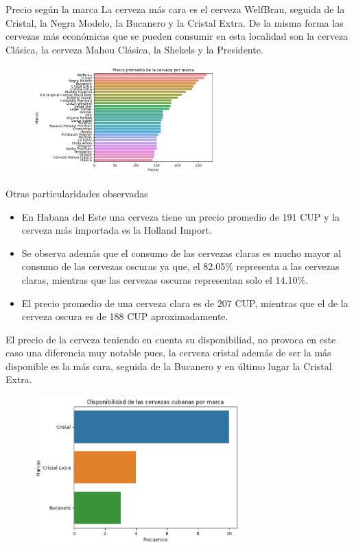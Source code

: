\documentclass{beamer}
\begin{document}
    \begin{frame}{Precio según la marca}
        \small La cerveza más cara es el cerveza WelfBrau, seguida de la Cristal, la Negra Modelo, la Bucanero y la Cristal Extra. De la misma forma las cervezas más económicas que se pueden consumir en esta localidad son la cerveza Clásica, la cerveza Mahou Clásica, la Shekels y la Presidente. 
        \begin{figure}[h]
        	\centering
        	\includegraphics[width=7cm]{price beer.png}
        \end{figure}

    \end{frame}
    \begin{frame}{Otras particularidades observadas}
        \begin{itemize}
    \item En Habana del Este una cerveza tiene un precio promedio de 191 CUP y la cerveza más importada es la Holland Import.
    \item  Se observa además que el consumo de las cervezas claras es mucho mayor al consumo de las cervezas oscuras ya que, el 82.05\% representa a las cervezas claras, mientras que las cervezas oscuras representan solo el 14.10\%.
    \item El precio promedio de una cerveza clara es de 207 CUP, mientras que el de la cerveza oscura es de 188 CUP aproximadamente.
   \end{itemize}

    \end{frame}
    \begin{frame}
     El precio de la cerveza teniendo en cuenta su disponibiliad, no provoca en este caso una diferencia muy notable pues, la cerveza cristal además de ser la más disponible es la más cara, seguida de la Bucanero y en último lugar la Cristal Extra.
     \begin{figure}[h]
     	\centering
     	\includegraphics[width=8cm]{cuban beer amount.png}
     \end{figure}

    \end{frame}
\end{document}
